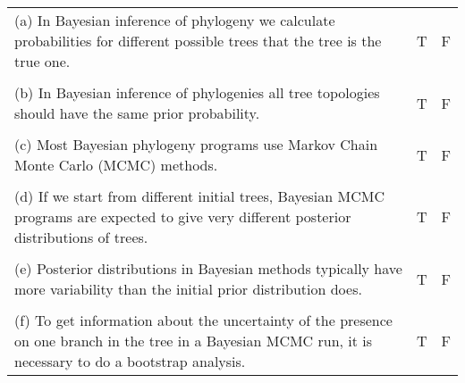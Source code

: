 \documentclass[12pt]{article}
\begin{document}
\begin{enumerate}
\begin{tabular}{l | c | c |}
\parbox[t]{5in}{(a) In Bayesian inference of phylogeny we calculate
probabilities for different possible trees that the tree is the true one.} & \hspace{0.2in}
T\hspace{0.2in} &\hspace{0.2in} F\hspace{0.2in} \\
& & \\
\parbox[t]{5in}{(b) In Bayesian inference of phylogenies all tree topologies should have
the same prior probability.} & \hspace{0.2in}
T\hspace{0.2in} &\hspace{0.2in} F\hspace{0.2in} \\
& & \\
\parbox[t]{5in}{(c) Most Bayesian phylogeny programs use Markov Chain Monte
Carlo (MCMC) methods.} & \hspace{0.2in}
T\hspace{0.2in} &\hspace{0.2in} F\hspace{0.2in} \\
& & \\
\parbox[t]{5in}{(d) If we start from different initial trees, Bayesian MCMC
programs are expected to give very different posterior distributions of trees. } & \hspace{0.2in}
T\hspace{0.2in} &\hspace{0.2in} F\hspace{0.2in} \\
& & \\
\parbox[t]{5in}{(e) Posterior distributions in Bayesian methods typically
have more variability than the initial prior distribution does. } & \hspace{0.2in}
T\hspace{0.2in} &\hspace{0.2in} F\hspace{0.2in} \\
& & \\
\parbox[t]{5in}{(f) To get information about the uncertainty of the
presence on one branch in the tree in a Bayesian MCMC run, it is necessary to
do a bootstrap analysis.} & \hspace{0.2in}
T\hspace{0.2in} &\hspace{0.2in} F\hspace{0.2in} \\

\end{tabular}
\end{enumerate}
\end{document}
